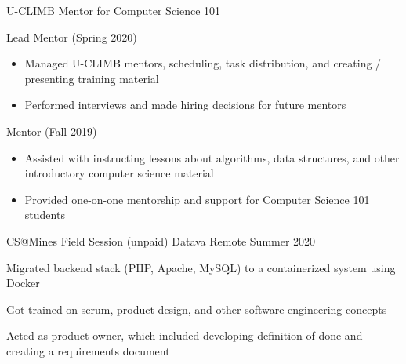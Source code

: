 \begin{cventries}
    \vspace{-1.0mm}
    \cventry
    	{U-CLIMB Mentor for Computer Science 101}
    	{}
    	{ }
	   	 {}
   	 {
   	 \begin{cvitems}
         \item {Lead Mentor (Spring 2020)}
         \begin{itemize}
         \item {Managed U-CLIMB mentors, scheduling, task
    	distribution, and creating /
      presenting training material}
          \item {Performed interviews and made hiring decisions for future mentors}
         \end{itemize}
         \ifcv
         \item {Mentor (Fall 2019)}
         \begin{itemize}
            	 \item {Assisted with instructing lessons about algorithms, data structures, and other introductory computer science material}
   	         \item {Provided one-on-one mentorship and support for
    	Computer Science 101 students}
        \end{itemize}
        \fi
      \end{cvitems}
      }
      {}

      \ifcv
    \cventry
    {CS@Mines Field Session (unpaid)}
    {Datava}
    {Remote}
    {Summer 2020}
    {
      \begin{cvitems}
        \item Migrated backend stack (PHP, Apache, MySQL) to a containerized system using Docker
        \item Got trained on scrum, product design, and other software engineering concepts
        \item Acted as product owner, which included developing definition of done and creating a requirements document
      \end{cvitems}
    }
    {}

    


\end{cventries}
